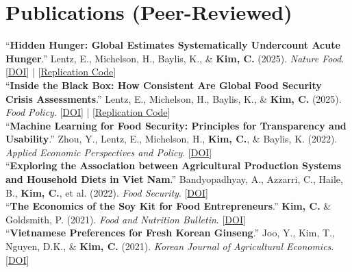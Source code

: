 \documentclass[a4paper,11pt]{article}
\begin{document}
\section{\textbf{Publications (Peer-Reviewed)}}
\small{

“\textbf{Hidden Hunger: Global Estimates Systematically Undercount Acute Hunger}.” Lentz, E., Michelson, H., Baylis, K., \& \textbf{Kim, C.} (2025). \colorbox{gray!10}{\textit{Nature Food}}. [\href{https://doi.org/10.1038/s43016-025-01267-z}{DOI}] | [{\href{https://github.com/mnmx0101/IPC_Paper}{Replication Code}}] \\[6pt]

“\textbf{Inside the Black Box: How Consistent Are Global Food Security Crisis Assessments}.” Lentz, E., Michelson, H., Baylis, K., \& \textbf{Kim, C.} (2025). \colorbox{gray!10}{\textit{Food Policy}}. [\href{https://doi.org/10.1016/j.foodpol.2025.103028}{DOI}] | [{\href{https://github.com/mnmx0101/ipc_consistency_paper}{Replication Code}}] \\[6pt]

“\textbf{Machine Learning for Food Security: Principles for Transparency and Usability}.” Zhou, Y., Lentz, E., Michelson, H., \textbf{Kim, C.}, \& Baylis, K. (2022). \colorbox{gray!10}{\textit{Applied Economic Perspectives and Policy}}. [\href{https://doi.org/10.1002/aepp.13281}{DOI}] \\[6pt]

“\textbf{Exploring the Association between Agricultural Production Systems and Household Diets in Viet Nam}.” Bandyopadhyay, A., Azzarri, C., Haile, B., \textbf{Kim, C.}, et al. (2022). \colorbox{gray!10}{\textit{Food Security}}. [\href{https://doi.org/10.1007/s12571-022-01283-7}{DOI}] \\[6pt]

“\textbf{The Economics of the Soy Kit for Food Entrepreneurs}.” \textbf{Kim, C.} \& Goldsmith, P. (2021). \colorbox{gray!10}{\textit{Food and Nutrition Bulletin}}. [\href{https://doi.org/10.1177/03795721211023391}{DOI}] \\[6pt]

“\textbf{Vietnamese Preferences for Fresh Korean Ginseng}.” Joo, Y., Kim, T., Nguyen, D.K., \& \textbf{Kim, C.} (2021). \colorbox{gray!10}{\textit{Korean Journal of Agricultural Economics}}. [\href{https://doi.org/10.24102/kjae.2021.62.3.1}{DOI}]

}

\end{document}
